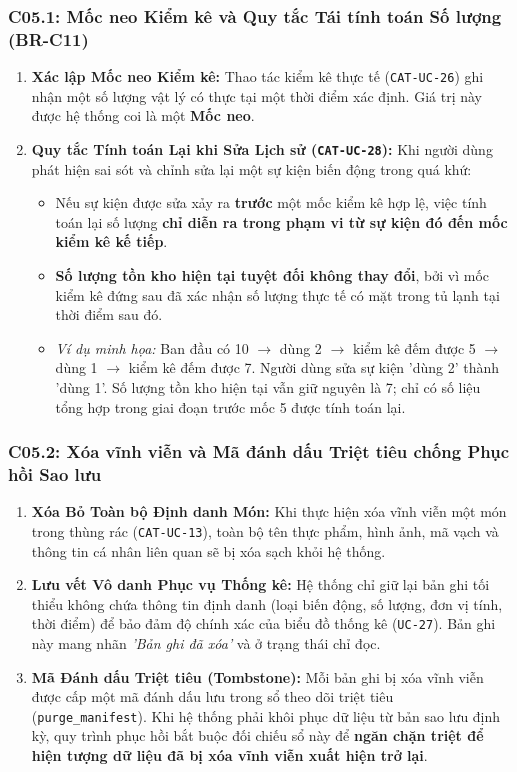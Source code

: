 \documentclass[10pt,a4paper]{article}
\begin{document}
\subsubsection{C05.1: Mốc neo Kiểm kê và Quy tắc Tái tính toán Số lượng (BR-C11)}
\begin{enumerate}[itemsep=2pt]
    \item \textbf{Xác lập Mốc neo Kiểm kê:} Thao tác kiểm kê thực tế (\texttt{CAT-UC-26}) ghi nhận một số lượng vật lý có thực tại một thời điểm xác định. Giá trị này được hệ thống coi là một \textbf{Mốc neo}.
    \item \textbf{Quy tắc Tính toán Lại khi Sửa Lịch sử (\texttt{CAT-UC-28}):} Khi người dùng phát hiện sai sót và chỉnh sửa lại một sự kiện biến động trong quá khứ:
    \begin{itemize}
        \item Nếu sự kiện được sửa xảy ra \textbf{trước} một mốc kiểm kê hợp lệ, việc tính toán lại số lượng \textbf{chỉ diễn ra trong phạm vi từ sự kiện đó đến mốc kiểm kê kế tiếp}.
        \item \textbf{Số lượng tồn kho hiện tại tuyệt đối không thay đổi}, bởi vì mốc kiểm kê đứng sau đã xác nhận số lượng thực tế có mặt trong tủ lạnh tại thời điểm sau đó.
        \item \textit{Ví dụ minh họa:} Ban đầu có 10 $\to$ dùng 2 $\to$ kiểm kê đếm được 5 $\to$ dùng 1 $\to$ kiểm kê đếm được 7. Người dùng sửa sự kiện 'dùng 2' thành 'dùng 1'. Số lượng tồn kho hiện tại vẫn giữ nguyên là 7; chỉ có số liệu tổng hợp trong giai đoạn trước mốc 5 được tính toán lại.
    \end{itemize}
\end{enumerate}

\subsubsection{C05.2: Xóa vĩnh viễn và Mã đánh dấu Triệt tiêu chống Phục hồi Sao lưu}
\begin{enumerate}[itemsep=2pt]
    \item \textbf{Xóa Bỏ Toàn bộ Định danh Món:} Khi thực hiện xóa vĩnh viễn một món trong thùng rác (\texttt{CAT-UC-13}), toàn bộ tên thực phẩm, hình ảnh, mã vạch và thông tin cá nhân liên quan sẽ bị xóa sạch khỏi hệ thống.
    \item \textbf{Lưu vết Vô danh Phục vụ Thống kê:} Hệ thống chỉ giữ lại bản ghi tối thiểu không chứa thông tin định danh (loại biến động, số lượng, đơn vị tính, thời điểm) để bảo đảm độ chính xác của biểu đồ thống kê (\texttt{UC-27}). Bản ghi này mang nhãn \textit{'Bản ghi đã xóa'} và ở trạng thái chỉ đọc.
    \item \textbf{Mã Đánh dấu Triệt tiêu (Tombstone):} Mỗi bản ghi bị xóa vĩnh viễn được cấp một mã đánh dấu lưu trong sổ theo dõi triệt tiêu (\texttt{purge\_manifest}). Khi hệ thống phải khôi phục dữ liệu từ bản sao lưu định kỳ, quy trình phục hồi bắt buộc đối chiếu sổ này để \textbf{ngăn chặn triệt để hiện tượng dữ liệu đã bị xóa vĩnh viễn xuất hiện trở lại}.
\end{enumerate}
\end{document}
